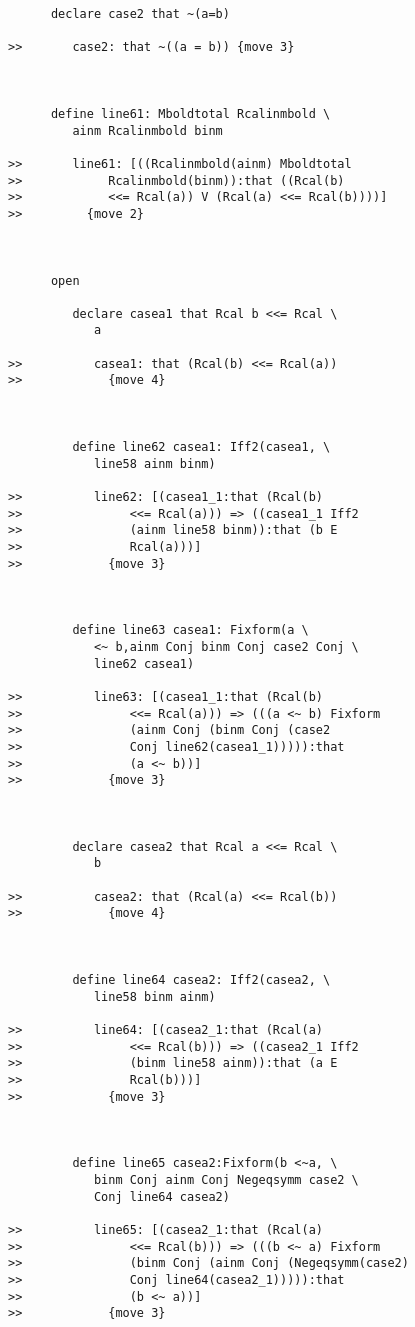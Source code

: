 \documentclass[12pt]{article}
\begin{document}
\begin{verbatim}
      declare case2 that ~(a=b)

>>       case2: that ~((a = b)) {move 3}



      define line61: Mboldtotal Rcalinmbold \
         ainm Rcalinmbold binm

>>       line61: [((Rcalinmbold(ainm) Mboldtotal
>>            Rcalinmbold(binm)):that ((Rcal(b)
>>            <<= Rcal(a)) V (Rcal(a) <<= Rcal(b))))]
>>         {move 2}



      open

         declare casea1 that Rcal b <<= Rcal \
            a

>>          casea1: that (Rcal(b) <<= Rcal(a))
>>            {move 4}



         define line62 casea1: Iff2(casea1, \
            line58 ainm binm)

>>          line62: [(casea1_1:that (Rcal(b)
>>               <<= Rcal(a))) => ((casea1_1 Iff2
>>               (ainm line58 binm)):that (b E
>>               Rcal(a)))]
>>            {move 3}



         define line63 casea1: Fixform(a \
            <~ b,ainm Conj binm Conj case2 Conj \
            line62 casea1)

>>          line63: [(casea1_1:that (Rcal(b)
>>               <<= Rcal(a))) => (((a <~ b) Fixform
>>               (ainm Conj (binm Conj (case2
>>               Conj line62(casea1_1))))):that
>>               (a <~ b))]
>>            {move 3}



         declare casea2 that Rcal a <<= Rcal \
            b

>>          casea2: that (Rcal(a) <<= Rcal(b))
>>            {move 4}



         define line64 casea2: Iff2(casea2, \
            line58 binm ainm)

>>          line64: [(casea2_1:that (Rcal(a)
>>               <<= Rcal(b))) => ((casea2_1 Iff2
>>               (binm line58 ainm)):that (a E
>>               Rcal(b)))]
>>            {move 3}



         define line65 casea2:Fixform(b <~a, \
            binm Conj ainm Conj Negeqsymm case2 \
            Conj line64 casea2)

>>          line65: [(casea2_1:that (Rcal(a)
>>               <<= Rcal(b))) => (((b <~ a) Fixform
>>               (binm Conj (ainm Conj (Negeqsymm(case2)
>>               Conj line64(casea2_1))))):that
>>               (b <~ a))]
>>            {move 3}




\end{verbatim}
\end{document}
